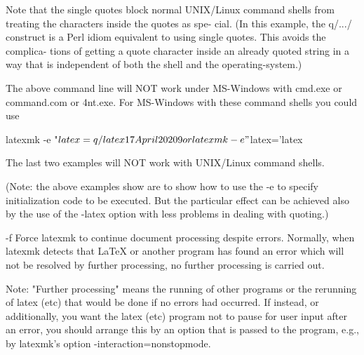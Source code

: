               Note that the single  quotes  block  normal  UNIX/Linux  command
              shells  from  treating  the characters inside the quotes as spe-
              cial.  (In this example, the q/.../ construct is  a  Perl  idiom
              equivalent  to  using  single quotes.  This avoids the complica-
              tions of getting a quote  character  inside  an  already  quoted
              string  in  a  way that is independent of both the shell and the
              operating-system.)

              The above command line  will  NOT  work  under  MS-Windows  with
              cmd.exe  or  command.com  or 4nt.exe.  For MS-Windows with these
              command shells you could use

                   latexmk -e "$latex=q/latex %




                                 17 April 2020                               9








              or

                   latexmk -e "$latex='latex %

              The last two examples will  NOT  work  with  UNIX/Linux  command
              shells.

              (Note:  the above examples show are to show how to use the -e to
              specify initialization code to be executed.  But the  particular
              effect can be achieved also by the use of the -latex option with
              less problems in dealing with quoting.)


       -f     Force latexmk to continue document  processing  despite  errors.
              Normally, when latexmk detects that LaTeX or another program has
              found an error which will not be resolved by further processing,
              no further processing is carried out.

              Note:  "Further  processing" means the running of other programs
              or the rerunning of latex (etc) that would be done if no  errors
              had  occurred.   If instead, or additionally, you want the latex
              (etc) program not to pause for user input after  an  error,  you
              should  arrange this by an option that is passed to the program,
              e.g., by latexmk's option -interaction=nonstopmode.


